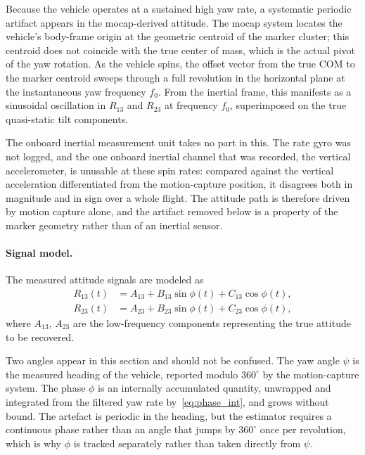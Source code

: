 Because the vehicle operates at a sustained high yaw rate, a systematic periodic artifact appears in the mocap-derived attitude.
The mocap system locates the vehicle's body-frame origin at the geometric
centroid of the marker cluster; this centroid does not coincide with the true
center of mass, which is the actual pivot of the yaw rotation.  As the vehicle
spins, the offset vector from the true COM to the marker centroid sweeps through
a full revolution in the horizontal plane at the instantaneous yaw frequency
$f_0$.  From the inertial frame, this manifests as a sinusoidal oscillation in
$R_{13}$ and $R_{23}$ at frequency $f_0$, superimposed on the true
quasi-static tilt components.

The onboard inertial measurement unit takes no part in this.  The rate gyro
was not logged, and the one onboard inertial channel that was recorded, the
vertical accelerometer, is unusable at these spin rates: compared against the
vertical acceleration differentiated from the motion-capture position, it
disagrees both in magnitude and in sign over a whole flight.  The attitude
path is therefore driven by motion capture alone, and the artifact removed
below is a property of the marker geometry rather than of an inertial sensor.

\paragraph{Signal model.}
The measured attitude signals are modeled as
\begin{align}
    R_{13}(t) &= A_{13} + B_{13}\sin\phi(t) + C_{13}\cos\phi(t),
    \label{eq:R13model}\\
    R_{23}(t) &= A_{23} + B_{23}\sin\phi(t) + C_{23}\cos\phi(t),
    \label{eq:R23model}
\end{align}
where $A_{13}$, $A_{23}$ are the low-frequency components representing the true
attitude to be recovered.

Two angles appear in this section and should not be confused.  The yaw angle
$\psi$ is the measured heading of the vehicle, reported modulo $360^{\circ}$ by
the motion-capture system.  The phase $\phi$ is an internally accumulated
quantity, unwrapped and integrated from the filtered yaw rate
by~\eqref{eq:phase_int}, and grows without bound.  The artefact is periodic in
the heading, but the estimator requires a continuous phase rather than an angle
that jumps by $360^{\circ}$ once per revolution, which is why $\phi$ is tracked
separately rather than taken directly from $\psi$.

